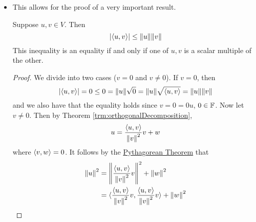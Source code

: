 \documentclass[../main.tex]{subfiles}
\begin{document}
\begin{itemize}
\begin{theorem}
\begin{proof}
            \begin{equation*}
                u=cv+(u-cv)
            \end{equation*}
            so we need only choose $c$ such that $v$ is orthogonal to $u-cv$. In other words, we want
            \begin{align*}
                0 &= \inp{u-cv}{v}\\
                &= \inp{u}{v}+\inp{-cv}{v}\\
                &= \inp{u}{v}-c\inp{v}{v}\\
                &= \inp{u}{v}-c\norm{v}^2
                c &= \frac{\inp{u}{v}}{\norm{v}^2}
            \end{align*}
            But this gives the values we want for $c$ and $w$, as desired.
        \end{proof}
    \end{theorem}
    \item This allows for the proof of a very important result.
    \begin{theorem}\label{trm:CauchySchwarz}
        Suppose $u,v\in V$. Then
        \begin{equation*}
            |\langle{u},{v}\rangle| \leq \norm{u}\norm{v}
        \end{equation*}
        This inequality is an equality if and only if one of $u,v$ is a scalar multiple of the other.
        \begin{proof}
            We divide into two cases ($v=0$ and $v\neq 0$). If $v=0$, then
            \begin{equation*}
                |\langle{u},{v}\rangle| = 0 \leq 0 = \norm{u}\sqrt{0} = \norm{u}\sqrt{\langle{u},{v}\rangle} = \norm{u}\norm{v}
            \end{equation*}
            and we also have that the equality holds since $v=0=0u$, $0\in\mathbb{F}$. Now let $v\neq 0$. Then by Theorem \ref{trm:orthogonalDecomposition},
            \begin{equation*}
                u = \frac{\langle{u},{v}\rangle}{\norm{v}^2}v+w
            \end{equation*}
            where $\langle{v},{w}\rangle=0$. It follows by the \hyperref[trm:pythagorean]{Pythagorean Theorem} that
            \begin{align*}
                \norm{u}^2 &= \norm{\frac{\inp{u}{v}}{\norm{v}^2}v}^2+\norm{w}^2\\
                &= \inp{\frac{\inp{u}{v}}{\norm{v}^2}v}{\frac{\inp{u}{v}}{\norm{v}^2}v}+\norm{w}^2\\

\end{align*}
\end{proof}
\end{theorem}
\end{itemize}
\end{document}
